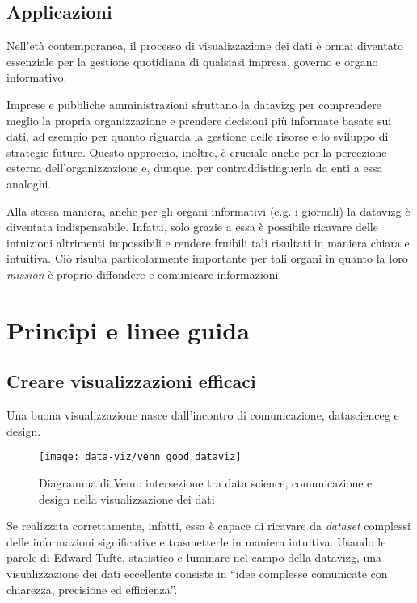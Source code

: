 \subsection{Applicazioni}
Nell'età contemporanea, il processo di visualizzazione dei dati è ormai diventato essenziale per la gestione quotidiana di qualsiasi 
impresa, governo e organo informativo.

Imprese e pubbliche amministrazioni sfruttano la \gls{datavizg} per comprendere meglio la propria organizzazione e 
prendere decisioni più informate basate sui dati, ad esempio per quanto riguarda la gestione delle risorse e lo sviluppo di strategie future. 
Questo approccio, inoltre, è cruciale anche per la percezione esterna dell'organizzazione e, dunque, per contraddistinguerla da enti a essa analoghi.

Alla stessa maniera, anche per gli organi informativi (e.g. i giornali) la \gls{datavizg} è diventata indispensabile. 
Infatti, solo grazie a essa è possibile ricavare delle intuizioni altrimenti impossibili e rendere fruibili 
tali risultati in maniera chiara e intuitiva. Ciò risulta particolarmente importante per tali organi in quanto la loro \emph{mission} è proprio diffondere 
e comunicare informazioni.



\section{Principi e linee guida}
\subsection{Creare visualizzazioni efficaci}
Una buona visualizzazione nasce dall'incontro di comunicazione, \gls{datascienceg} e design.
\begin{figure}[H] 
    \centering 
    \texttt{[image: data-viz/venn\_good\_dataviz]} 
    \caption{Diagramma di Venn: intersezione tra data science, comunicazione e design nella visualizzazione dei dati}
    \label{fig:venn_good_dataviz}
\end{figure}

\noindent Se realizzata correttamente, infatti, essa è capace di ricavare da \emph{dataset} complessi delle informazioni significative e trasmetterle in maniera intuitiva.
Usando le parole di Edward Tufte, statistico e luminare nel campo della \gls{datavizg}, una visualizzazione dei dati eccellente consiste in
``idee complesse comunicate con chiarezza, precisione ed efficienza''.

